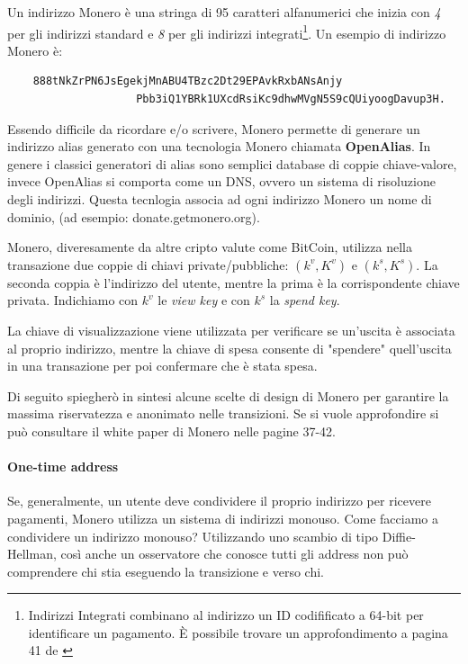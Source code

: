 \documentclass[12pt,a4paper]{article}
\begin{document}
Un indirizzo Monero è una stringa di 95 caratteri alfanumerici che inizia con
\textit{4} per gli indirizzi standard e \textit{8} per gli indirizzi
integrati\footnote{Indirizzi Integrati combinano al indirizzo un ID codifificato
a 64-bit per identificare un pagamento. È possibile trovare un approfondimento a
pagina 41 de \cite{Zero To Monero}}. Un esempio di indirizzo Monero è:

\begin{verbatim}
    888tNkZrPN6JsEgekjMnABU4TBzc2Dt29EPAvkRxbANsAnjy
                    Pbb3iQ1YBRk1UXcdRsiKc9dhwMVgN5S9cQUiyoogDavup3H.
\end{verbatim}

Essendo difficile da ricordare e/o scrivere, Monero permette di generare un
indirizzo alias generato con una tecnologia Monero chiamata \textbf{OpenAlias}.
In genere i classici generatori di alias sono semplici database di coppie
chiave-valore, invece OpenAlias si comporta come un DNS, ovvero un sistema di
risoluzione degli indirizzi. Questa tecnlogia associa ad ogni indirizzo Monero
un nome di dominio, (ad esempio: donate.getmonero.org).

Monero, diveresamente da altre cripto valute come BitCoin, utilizza nella
transazione due coppie di chiavi private/pubbliche: $(k^v, K^v)$ e $(k^s, K^s)$.
La seconda coppia è l'indirizzo del utente, mentre la prima è la corrispondente
chiave privata. Indichiamo con $k^v$ le \textit{view key} e con $k^s$ la
\textit{spend key}.

La chiave di visualizzazione viene utilizzata per verificare se un'uscita è
associata al proprio indirizzo, mentre la chiave di spesa consente di "spendere"
quell'uscita in una transazione per poi confermare che è stata spesa.

Di seguito spiegherò in sintesi alcune scelte di design di Monero per garantire
la massima riservatezza e anonimato nelle transizioni. Se si vuole approfondire
si può consultare il white paper di Monero \cite{Zero To Monero} nelle pagine
37-42.

\paragraph{One-time address}
Se, generalmente, un utente deve condividere il proprio indirizzo per ricevere
pagamenti, Monero utilizza un sistema di indirizzi monouso. Come facciamo a
condividere un indirizzo monouso? Utilizzando uno scambio di tipo
Diffie-Hellman, così anche un osservatore che conosce tutti gli address non può
comprendere chi stia eseguendo la transizione e verso chi.
\end{document}
